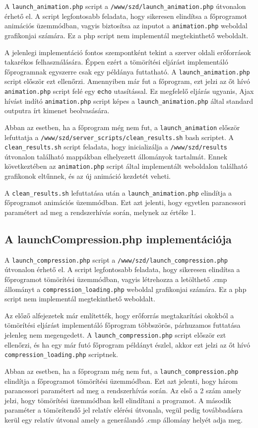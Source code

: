 \documentclass[oneside,titlepage,12pt,a4paper]{report}
\begin{document}
A \texttt{launch\_animation.php} script a \texttt{/www/szd/launch\_animation.php} útvonalon érhető el. A script legfontosabb feladata, hogy sikeresen elindítsa a főprogramot animációs üzemmódban, vagyis biztosítsa az inputot a \texttt{animation.php} weboldal grafikonjai számára. Ez a php script nem implementál megtekinthető weboldalt.
\par A jelenlegi implementáció fontos szempontként tekint a szerver oldali erőforrások takarékos felhasználására. Éppen ezért a tömörítési eljárást implementáló főprogramnak egyszerre csak egy példánya futtatható. A \texttt{launch\_animation.php} script először ezt ellenőrzi. Amennyiben már fut a főprogram, ezt jelzi az őt hívó \texttt{animation.php} script felé egy \texttt{echo} utasítással. Ez megfelelő eljárás ugyanis, Ajax hívást indító \texttt{animation.php} script képes a \texttt{launch\_animation.php} által standard outputra írt kimenet beolvasására. 
\par Abban az esetben, ha a főprogram még nem fut, a \texttt{launch\_animation} először lefuttatja a \texttt{/www/szd/server\_scripts/clean\_results.sh} bash scriptet. A \texttt{clean\_results.sh} script feladata, hogy inicializálja a \texttt{/www/szd/results} útvonalon található mappákban elhelyezett állományok tartalmát. Ennek következtében az \texttt{animation.php} script által implementált weboldalon található grafikonok eltűnnek, és az új animáció kezdetét veheti.
\par A \texttt{clean\_results.sh} lefuttatása után a \texttt{launch\_animation.php} elindítja a főprogramot animációs üzemmódban. Ezt azt jelenti, hogy egyetlen parancssori paramétert ad meg a rendszerhívás során, melynek az értéke 1.

\subsection{A launchCompression.php implementációja}

A \texttt{launch\_compression.php} script a \texttt{/www/szd/launch\_compression.php} útvonalon érhető el. A script legfontosabb feladata, hogy sikeresen elindítsa a főprogramot tömörítési üzemmódban, vagyis létrehozza a letölthető .cmp állományt a \texttt{compression\_loading.php} weboldal grafikonjai számára. Ez a php script nem implementál megtekinthető weboldalt.
\par Az előző alfejezetek már említették, hogy erőforrás megtakarítási okokból a tömörítési eljárást implementáló főprogram többszörös, párhuzamos futtatása jelenleg nem megengedett. A \texttt{launch\_compression.php} script először ezt ellenőrzi, és ha egy már futó főprogram példányt észlel, akkor ezt jelzi az őt hívó \texttt{compression\_loading.php} scriptnek.
\par Abban az esetben, ha a főprogram még nem fut, a \texttt{launch\_compression.php}  elindítja a főprogramot tömörítési üzemmódban. Ezt azt jelenti, hogy három parancssori paramétert ad meg a rendszerhívás során. Az első a 2 szám amely jelzi, hogy tömörítési üzemmódban kell elindítani a programot. A második paraméter a tömörítendő jel relatív elérési útvonala, vegül pedig továbbadásra kerül egy relatív útvonal amely a generálandó .cmp állomány helyét adja meg.
\end{document}
